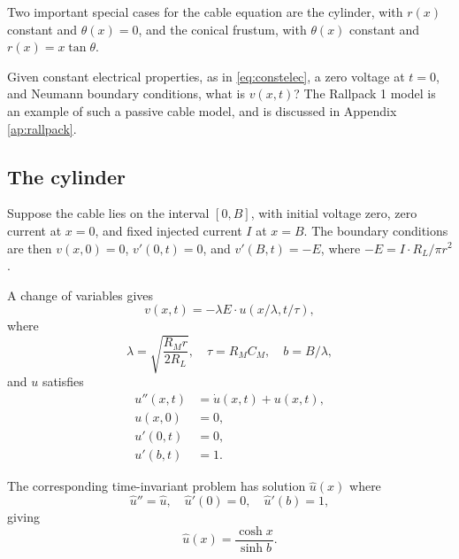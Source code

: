 \documentclass[parskip=half]{scrartcl}
\theoremstyle{nonumberplain}
\begin{document}
Two important special cases for the cable equation are the cylinder,
with $r(x)$ constant and $\theta(x)=0$, and the conical frustum,
with $\theta(x)$ constant and $r(x)=x\tan\theta$.

Given constant electrical properties, as in \eqref{eq:constelec},
a zero voltage at $t=0$, and Neumann boundary conditions, what
is $v(x, t)$? The Rallpack 1 model \autocite{bhalla1992} is
an example of such a passive cable model, and is discussed in
Appendix \ref{ap:rallpack}.

\subsection{The cylinder}

Suppose the cable lies on the interval $[0, B]$, with initial
voltage zero, zero current
at $x=0$, and fixed injected current $I$ at $x=B$. The boundary
conditions are then $v(x,0) = 0$, $v'(0, t) = 0$, and $v'(B, t) = -E$,
where $-E = I\cdot R_L/\pi r^2$.

A change of variables gives
\begin{equation}
    v(x, t) = -\lambda E\cdot u(x/\lambda, t/\tau),
\end{equation}
where
\begin{equation}
    \lambda = \sqrt{\frac{R_M r}{2 R_L}}, \quad \tau = R_M C_M, \quad b = B/\lambda,
\end{equation}
and $u$ satisfies
\begin{equation}
    \begin{aligned}
        u''(x, t) &= \dot u(x, t) + u(x, t),\\
        u(x, 0) &= 0,\\
        u'(0, t) &= 0,\\
        u'(b, t) &= 1.
    \end{aligned}
    \label{eq:ucyl}
\end{equation}

The corresponding time-invariant problem has solution $\hat u(x)$ where
\begin{equation}
    \hat u'' = \hat u,\quad \hat u'(0) = 0,\quad \hat u'(b) = 1,
\end{equation}
giving
\begin{equation}
    \hat u(x) = \frac{\cosh x}{\sinh b}.
\end{equation}
\end{document}
